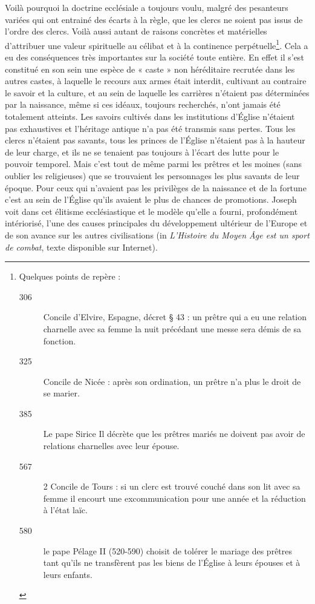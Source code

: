 Voilà pourquoi la doctrine ecclésiale a toujours voulu, malgré des pesanteurs variées qui ont entrainé des écarts à la règle, que les clercs ne soient pas issus de l'ordre des clercs. Voilà aussi autant de raisons concrètes et matérielles d'attribuer une valeur spirituelle au célibat et à la continence perpétuelle\footnote{Quelques points de repère :
\begin{description}
\item[306] Concile d’Elvire, Espagne, décret § 43 : un prêtre qui a eu une relation charnelle avec sa femme la nuit précédant une messe sera démis de sa fonction.
\item[325] Concile de Nicée : après son ordination, un prêtre n'a plus le droit de se marier.
\item[385] Le pape Sirice Il  décrète que les prêtres mariés ne doivent pas avoir de relations charnelles avec leur épouse.
\item[567] 2\ieme{} Concile de Tours : si un clerc est trouvé couché dans son lit avec sa femme il encourt une excommunication pour une année et la réduction à l’état laïc.
\item[580] le pape Pélage II (520-590) choisit de tolérer le mariage des prêtres tant qu'ils ne transfèrent pas les biens de l'Église à leurs épouses et à leurs enfants.
\end{description}}. Cela a eu des conséquences très importantes sur la société toute entière. En effet il s'est constitué en son sein une espèce de « caste » non héréditaire recrutée dans les autres castes, à laquelle le recours aux armes était interdit, cultivant au contraire le savoir et la culture, et au sein de laquelle les carrières n'étaient pas déterminées par la naissance, même si ces idéaux, toujours recherchés, n'ont jamais été totalement atteints. Les savoirs cultivés dans les institutions d'Église n'étaient pas exhaustives et l'héritage antique n'a pas été transmis sans pertes. Tous les clercs n'étaient pas savants, tous les princes de l'Église n'étaient pas à la hauteur de leur charge, et ils ne se tenaient pas toujours à l'écart des lutte pour le pouvoir temporel. Mais c'est tout de même parmi les prêtres et les moines (sans oublier les religieuses) que se trouvaient les personnages les plus savants de leur époque. Pour ceux qui n'avaient pas les privilèges de la naissance et de la fortune c'est au sein de l'Église qu'ils avaient le plus de chances de promotions. Joseph  voit dans cet élitisme ecclésiastique et le modèle qu'elle a fourni, profondément intériorisé, l'une des causes principales du développement ultérieur de l'Europe et de son avance sur les autres civilisations (in \emph{L'Histoire du Moyen Âge est un sport de combat}, texte disponible sur Internet).
 
